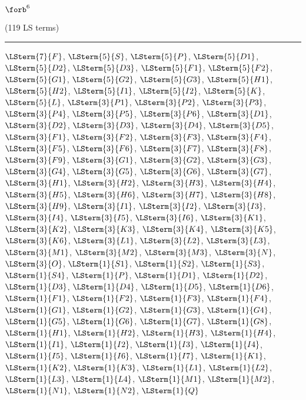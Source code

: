 \begin{mdframed}\begin{center}
$\forb^{6}$

(119 LS terms)
\vspace{0.25cm}\hrule\vspace{0.25cm}

$\LSterm{7}{F}$, $\LSterm{5}{S}$, $\LSterm{5}{P}$, $\LSterm{5}{D1}$, $\LSterm{5}{D2}$, $\LSterm{5}{D3}$, $\LSterm{5}{F1}$, $\LSterm{5}{F2}$, $\LSterm{5}{G1}$, $\LSterm{5}{G2}$, $\LSterm{5}{G3}$, $\LSterm{5}{H1}$, $\LSterm{5}{H2}$, $\LSterm{5}{I1}$, $\LSterm{5}{I2}$, $\LSterm{5}{K}$, $\LSterm{5}{L}$, $\LSterm{3}{P1}$, $\LSterm{3}{P2}$, $\LSterm{3}{P3}$, $\LSterm{3}{P4}$, $\LSterm{3}{P5}$, $\LSterm{3}{P6}$, $\LSterm{3}{D1}$, $\LSterm{3}{D2}$, $\LSterm{3}{D3}$, $\LSterm{3}{D4}$, $\LSterm{3}{D5}$, $\LSterm{3}{F1}$, $\LSterm{3}{F2}$, $\LSterm{3}{F3}$, $\LSterm{3}{F4}$, $\LSterm{3}{F5}$, $\LSterm{3}{F6}$, $\LSterm{3}{F7}$, $\LSterm{3}{F8}$, $\LSterm{3}{F9}$, $\LSterm{3}{G1}$, $\LSterm{3}{G2}$, $\LSterm{3}{G3}$, $\LSterm{3}{G4}$, $\LSterm{3}{G5}$, $\LSterm{3}{G6}$, $\LSterm{3}{G7}$, $\LSterm{3}{H1}$, $\LSterm{3}{H2}$, $\LSterm{3}{H3}$, $\LSterm{3}{H4}$, $\LSterm{3}{H5}$, $\LSterm{3}{H6}$, $\LSterm{3}{H7}$, $\LSterm{3}{H8}$, $\LSterm{3}{H9}$, $\LSterm{3}{I1}$, $\LSterm{3}{I2}$, $\LSterm{3}{I3}$, $\LSterm{3}{I4}$, $\LSterm{3}{I5}$, $\LSterm{3}{I6}$, $\LSterm{3}{K1}$, $\LSterm{3}{K2}$, $\LSterm{3}{K3}$, $\LSterm{3}{K4}$, $\LSterm{3}{K5}$, $\LSterm{3}{K6}$, $\LSterm{3}{L1}$, $\LSterm{3}{L2}$, $\LSterm{3}{L3}$, $\LSterm{3}{M1}$, $\LSterm{3}{M2}$, $\LSterm{3}{M3}$, $\LSterm{3}{N}$, $\LSterm{3}{O}$, $\LSterm{1}{S1}$, $\LSterm{1}{S2}$, $\LSterm{1}{S3}$, $\LSterm{1}{S4}$, $\LSterm{1}{P}$, $\LSterm{1}{D1}$, $\LSterm{1}{D2}$, $\LSterm{1}{D3}$, $\LSterm{1}{D4}$, $\LSterm{1}{D5}$, $\LSterm{1}{D6}$, $\LSterm{1}{F1}$, $\LSterm{1}{F2}$, $\LSterm{1}{F3}$, $\LSterm{1}{F4}$, $\LSterm{1}{G1}$, $\LSterm{1}{G2}$, $\LSterm{1}{G3}$, $\LSterm{1}{G4}$, $\LSterm{1}{G5}$, $\LSterm{1}{G6}$, $\LSterm{1}{G7}$, $\LSterm{1}{G8}$, $\LSterm{1}{H1}$, $\LSterm{1}{H2}$, $\LSterm{1}{H3}$, $\LSterm{1}{H4}$, $\LSterm{1}{I1}$, $\LSterm{1}{I2}$, $\LSterm{1}{I3}$, $\LSterm{1}{I4}$, $\LSterm{1}{I5}$, $\LSterm{1}{I6}$, $\LSterm{1}{I7}$, $\LSterm{1}{K1}$, $\LSterm{1}{K2}$, $\LSterm{1}{K3}$, $\LSterm{1}{L1}$, $\LSterm{1}{L2}$, $\LSterm{1}{L3}$, $\LSterm{1}{L4}$, $\LSterm{1}{M1}$, $\LSterm{1}{M2}$, $\LSterm{1}{N1}$, $\LSterm{1}{N2}$, $\LSterm{1}{Q}$
\end{center}\end{mdframed}

